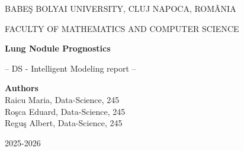 \documentclass[runningheads,a4paper,11pt]{report}
\begin{document}
\begin{titlepage}
\sloppy
\begin{center}
BABE\c S BOLYAI UNIVERSITY, CLUJ NAPOCA, ROM\^ ANIA

FACULTY OF MATHEMATICS AND COMPUTER SCIENCE

\vspace{6cm}

\Huge \textbf{Lung Nodule Prognostics}

\vspace{1cm}

\normalsize -- DS - Intelligent Modeling report --

\end{center}

\vspace{5cm}

\begin{flushright}
\Large{\textbf{Authors}}\\
Raicu Maria, Data-Science, 245 \\
Ro\c sca Eduard, Data-Science, 245 \\
Regu\c s Albert, Data-Science, 245 \\
\end{flushright}
\vspace{4cm}
\begin{center}
2025-2026
\end{center}
\end{titlepage}











\tableofcontents
\newpage
\listoftables
\listoffigures
\listofalgorithms
\newpage
{}
\newpage
{}


















\end{document}
